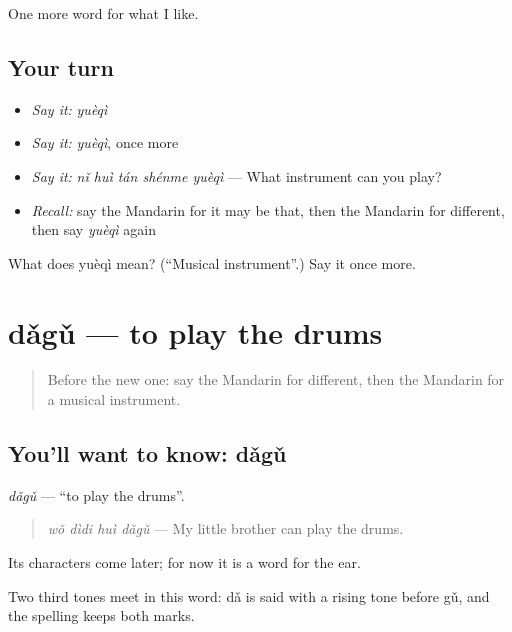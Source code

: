 \begin{grammarlens}[title={What you've built}]
One more word for what I like.
\end{grammarlens}

\subsection*{Your turn}
\begin{itemize}
\raggedright
  \item \emph{Say it:} \emph{yuèqì}
  \item \emph{Say it:} \emph{yuèqì}, once more
  \item \emph{Say it:} \emph{nǐ huì tán shénme yuèqì} — What instrument can you play?
  \item \emph{Recall:} say the Mandarin for it may be that, then the Mandarin for different, then say \emph{yuèqì} again
\end{itemize}

\begin{tcolorbox}[breakable,colback=teal!4,colframe=teal!35!black,title={Before you move on}]
What does yuèqì mean? (\textquotedblleft{}Musical instrument\textquotedblright{}.) Say it once more.
\end{tcolorbox}
\section[dǎgǔ]{dǎgǔ — to play the drums}

\label{lesson:ZH-C257-dagu}



\begin{quote}
Before the new one: say the Mandarin for different, then the Mandarin for a musical instrument.
\end{quote}

\subsection*{You'll want to know: dǎgǔ}
\emph{dǎgǔ} — \textquotedblleft{}to play the drums\textquotedblright{}.

\begin{quote}
\emph{wǒ dìdi huì dǎgǔ} — My little brother can play the drums.
\end{quote}

Its characters come later; for now it is a word for the ear.

Two third tones meet in this word: dǎ is said with a rising tone before gǔ, and the spelling keeps both marks.

